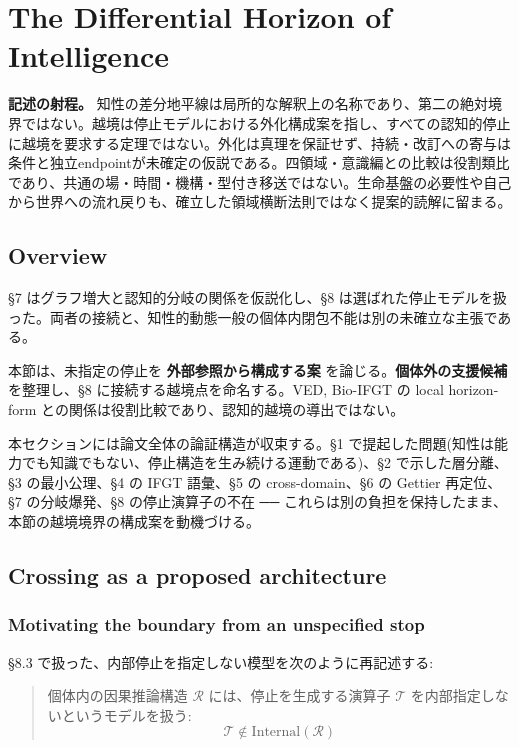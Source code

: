 \section{The Differential Horizon of Intelligence}

\noindent\textbf{記述の射程。} 知性の差分地平線は局所的な解釈上の名称であり、第二の絶対境界ではない。越境は停止モデルにおける外化構成案を指し、すべての認知的停止に越境を要求する定理ではない。外化は真理を保証せず、持続・改訂への寄与は条件と独立endpointが未確定の仮説である。四領域・意識編との比較は役割類比であり、共通の場・時間・機構・型付き移送ではない。生命基盤の必要性や自己から世界への流れ戻りも、確立した領域横断法則ではなく提案的読解に留まる。



\subsection{Overview}


\S{}7 はグラフ増大と認知的分岐の関係を仮説化し、\S{}8 は選ばれた停止モデルを扱った。両者の接続と、知性的動態一般の個体内閉包不能は別の未確立な主張である。

本節は、未指定の停止を \textbf{外部参照から構成する案} を論じる。\textbf{個体外の支援候補} を整理し、\S{}8 に接続する越境点を命名する。VED, Bio-IFGT の local horizon-form との関係は役割比較であり、認知的越境の導出ではない。

本セクションには論文全体の論証構造が収束する。\S{}1 で提起した問題(知性は能力でも知識でもない、停止構造を生み続ける運動である)、\S{}2 で示した層分離、\S{}3 の最小公理、\S{}4 の IFGT 語彙、\S{}5 の cross-domain、\S{}6 の Gettier 再定位、\S{}7 の分岐爆発、\S{}8 の停止演算子の不在 ── これらは別の負担を保持したまま、本節の越境境界の構成案を動機づける。

\subsection{Crossing as a proposed architecture}


\subsubsection{Motivating the boundary from an unspecified stop}


\S{}8.3 で扱った、内部停止を指定しない模型を次のように再記述する:

\begin{quote}
個体内の因果推論構造 $\mathcal{R}$ には、停止を生成する演算子 $\mathcal{T}$ を内部指定しないというモデルを扱う:
$$\mathcal{T} \notin \text{Internal}(\mathcal{R})$$
\end{quote}

